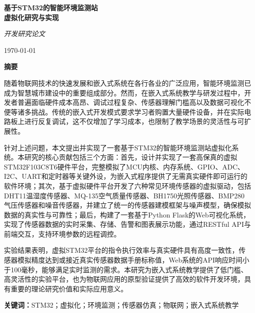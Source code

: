 \documentclass[12pt,a4paper]{ctexart}
\begin{document}
\begin{titlepage}
    \centering
    \vspace*{3cm}
    {\Huge\bfseries 基于STM32的智能环境监测站\\[0.5em]虚拟化研究与实现}
    
    \vspace{1.5cm}
    {\LARGE\itshape 开发研究论文}
    
    \vspace{3cm}
    {\large\today}
    
    \vfill
\end{titlepage}

\newpage
\begin{center}
    {\Large\bfseries 摘\quad 要}
\end{center}

随着物联网技术的快速发展和嵌入式系统在各行各业的广泛应用，智能环境监测已成为智慧城市建设中的重要组成部分。然而，在嵌入式系统教学与研发过程中，开发者普遍面临硬件成本高昂、调试过程复杂、传感器理解门槛高以及数据可视化不便等诸多挑战。传统的嵌入式开发模式要求学习者购置大量硬件设备，并在实际电路板上进行反复调试，这不仅增加了学习成本，也限制了教学场景的灵活性与可扩展性。

针对上述问题，本文提出并实现了一套基于STM32的智能环境监测站虚拟化系统。本研究的核心贡献包括三个方面：首先，设计并实现了一套高保真的虚拟STM32F103C8T6硬件平台，完整模拟了MCU内核、内存系统、GPIO、ADC、I2C、UART和定时器等关键外设，为嵌入式程序提供了无需真实硬件即可运行的软件环境；其次，基于虚拟硬件平台开发了六种常见环境传感器的虚拟驱动，包括DHT11温湿度传感器、MQ-135空气质量传感器、BH1750光照传感器、BMP280气压传感器和噪音传感器，并建立了统一的传感器建模框架与噪声模型，确保模拟数据的真实性与可靠性；最后，构建了一套基于Python Flask的Web可视化系统，实现了传感器数据的实时采集、存储、告警和图表展示功能，通过RESTful API与前端交互，支持环境参数的远程调控。

实验结果表明，虚拟STM32平台的指令执行效率与真实硬件具有高度一致性，传感器模拟精度达到或接近真实传感器数据手册标称值，Web系统的API响应时间小于100毫秒，能够满足实时监测的需求。本研究为嵌入式系统教学提供了低门槛、高灵活性的实验平台，也为物联网应用的原型验证提供了高效的软件开发环境，具有重要的理论研究价值和实际应用意义。

\vspace{1em}
\noindent\textbf{关键词：}STM32；虚拟化；环境监测；传感器仿真；物联网；嵌入式系统教学

\newpage
\tableofcontents
\newpage
\end{document}

